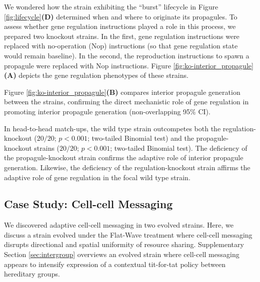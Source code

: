 We wondered how the strain exhibiting the ``burst'' lifecycle in Figure \ref{fig:lifecycle}\textbf{(D)} determined when and where to originate its propagules.
To assess whether gene regulation instructions played a role in this process, we prepared two knockout strains.
In the first, gene regulation instructions were replaced with no-operation (Nop) instructions (so that gene regulation state would remain baseline).
In the second, the reproduction instructions to spawn a propagule were replaced with Nop instructions.
Figure \ref{fig:ko-interior_propagule}\textbf{(A)} depicts the gene regulation phenotypes of these strains.

Figure \ref{fig:ko-interior_propagule}\textbf{(B)} compares interior propagule generation between the strains, confirming the direct mechanistic role of gene regulation in promoting interior propagule generation (non-overlapping 95\% CI).

In head-to-head match-ups, the wild type strain outcompetes both the regulation-knockout ($20/20$; $p < 0.001$; two-tailed Binomial test) and the propagule-knockout strains
($20/20$; $p < 0.001$; two-tailed Binomial test).
The deficiency of the propagule-knockout strain confirms the adaptive role of interior propagule generation.
Likewise, the deficiency of the regulation-knockout strain affirms the adaptive role of gene regulation in the focal wild type strain.

\subsection{Case Study: Cell-cell Messaging} \label{sec:cell-cell-messaging}



We discovered adaptive cell-cell messaging in two evolved strains.
Here, we discuss a strain evolved under the Flat-Wave treatment where cell-cell messaging disrupts directional and spatial uniformity of resource sharing.
Supplementary Section \ref{sec:intergroup} overviews an evolved strain where cell-cell messaging appears to intensify expression of a contextual tit-for-tat policy between hereditary groups.

